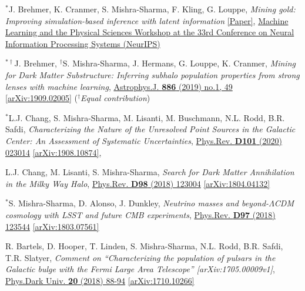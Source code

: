 \documentclass[11pt]{article}
\newenvironment{packed_enumerate}[1][]{
\begin{etaremune}[#1]
  \setlength{\itemsep}{3pt}
  \setlength{\parskip}{0pt}
  \setlength{\parsep}{0pt}}{\end{etaremune}
}
\begin{document}
\begin{packed_enumerate}[start=24]
\item $^*$J. Brehmer, K. Cranmer, S. Mishra-Sharma, F. Kling, G. Louppe,  \emph{Mining gold: Improving simulation-based inference with latent information} \href{https://ml4physicalsciences.github.io/files/NeurIPS_ML4PS_2019_16.pdf}{[Paper]}, \href{https://ml4physicalsciences.github.io/}{Machine Learning and the Physical Sciences Workshop at the 33rd Conference on Neural Information Processing Systems (NeurIPS)}

\item $^{*\dagger}$J. Brehmer, $^\dagger$S. Mishra-Sharma, J. Hermans, G. Louppe, K. Cranmer, \emph{Mining for Dark Matter Substructure: Inferring subhalo population properties from strong lenses with machine learning}, \href{https://iopscience.iop.org/article/10.3847/1538-4357/ab4c41}{Astrophys.J. \textbf{886} (2019) no.1, 49} \href{https://arxiv.org/abs/1909.02005}{[arXiv:1909.02005]} ($^\dagger$\emph{Equal contribution})

\item $^*$L.J. Chang, S. Mishra-Sharma, M. Lisanti, M. Buschmann, N.L. Rodd, B.R. Safdi, \emph{Characterizing the Nature of the Unresolved Point Sources in the Galactic Center: An Assessment of Systematic Uncertainties},  \href{https://journals.aps.org/prd/abstract/10.1103/PhysRevD.101.023014}{Phys.Rev. \textbf{D101} (2020) 023014} \href{https://arxiv.org/abs/1908.10874}{[arXiv:1908.10874]}, 

\item L.J. Chang, M. Lisanti, S. Mishra-Sharma, \emph{Search for Dark Matter Annihilation in the Milky Way Halo}, \href{https://journals.aps.org/prd/abstract/10.1103/PhysRevD.98.123004}{Phys.Rev. \textbf{D98} (2018) 123004} \href{https://arxiv.org/abs/1804.04132}{[arXiv:1804.04132]}

\item $^*$S. Mishra-Sharma, D. Alonso, J. Dunkley, \emph{Neutrino masses and beyond-$\Lambda$CDM cosmology with LSST and future CMB experiments}, \href{https://journals.aps.org/prd/abstract/10.1103/PhysRevD.97.123544}{Phys.Rev. \textbf{D97} (2018) 123544}  \href{https://arxiv.org/abs/1803.07561}{[arXiv:1803.07561]}

\item R. Bartels, D. Hooper, T. Linden, S. Mishra-Sharma, N.L. Rodd, B.R. Safdi, T.R. Slatyer, \emph{Comment on ``Characterizing the population of pulsars in the Galactic bulge with the
{\it Fermi} Large Area Telescope'' [arXiv:1705.00009\MakeLowercase{v}1]}, \href{https://www.sciencedirect.com/science/article/pii/S2212686418300268}{Phys.Dark Univ. \textbf{20} (2018) 88-94} \href{https://arxiv.org/abs/1710.10266}{[arXiv:1710.10266]}


\end{packed_enumerate}
\end{document}
